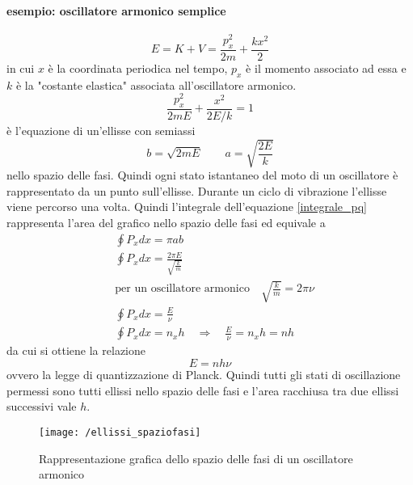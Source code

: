 \paragraph{esempio: oscillatore armonico semplice}
\begin{equation}
E = K + V = \frac{ p_x^2}{2m } + \frac{ k x^2}{2 }
\end{equation}
in cui $x$ è la coordinata periodica nel tempo, $p_x$ è il momento associato ad essa e $k$ è la "costante elastica" associata all'oscillatore armonico.
\begin{equation}
\frac{ p_x^2}{2mE } + \frac{ x^2}{2E / k } = 1
\end{equation}
è l'equazione di un'ellisse con semiassi
\begin{equation}
b = \sqrt{2mE} \quad\quad a = \sqrt{\frac{ 2E}{k }}
\end{equation}
nello spazio delle fasi.
Quindi ogni stato istantaneo del moto di un oscillatore è rappresentato da un punto sull'ellisse.
Durante un ciclo di vibrazione l'ellisse viene percorso una volta.
Quindi l'integrale dell'equazione \ref{integrale_pq} rappresenta l'area del grafico nello spazio delle fasi ed equivale a
\begin{equation}
\begin{split}
& \oint P_x dx = \pi a b \\
& \oint P_x dx = \frac{ 2\pi E}{\sqrt{\frac{ k}{m }} } \\
& \mbox{per un oscillatore armonico} \quad \sqrt{\frac{ k}{m }} = 2\pi\nu \\
& \oint P_x dx = \frac{ E}{\nu } \\
& \oint P_x dx = n_x h \quad\Rightarrow\quad  \frac{ E}{\nu } = n_x h = n h
\end{split}
\end{equation}
da cui si ottiene la relazione
\begin{equation}
E = n h \nu
\label{quant_planck}
\end{equation}
ovvero la legge di quantizzazione di Planck.
Quindi tutti gli stati di oscillazione permessi sono tutti ellissi nello spazio delle fasi e l'area racchiusa tra due ellissi successivi vale $h$.
\begin{figure}[h]
\centering
\texttt{[image: /ellissi\_spaziofasi]}
\caption{Rappresentazione grafica dello spazio delle fasi di un oscillatore armonico}
\end{figure}

